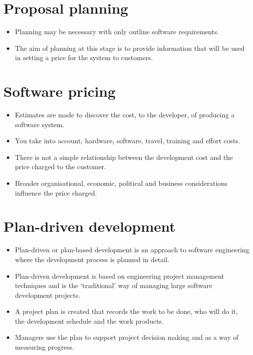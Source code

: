 \section{Proposal planning}
\begin{itemize}

\item Planning may be necessary with only outline software requirements.

\item The aim of planning at this stage is to provide information that will be used in setting a price for the system to customers.
\end{itemize}
\section{Software pricing}
\begin{itemize}

\item Estimates are made to discover the cost, to the developer, of producing a software system.

  \item You take into account, hardware, software, travel, training and effort costs.

\item There is not a simple relationship between the development cost and the price charged to the customer.

\item Broader organisational, economic, political and business considerations influence the price charged.
\end{itemize}

\section{Plan-driven development}
\begin{itemize}

\item Plan-driven or plan-based development is an approach to software engineering where the development process is planned in detail.

  \item Plan-driven development is based on engineering project management techniques and is the ‘traditional’ way of managing large software development projects.

\item A project plan is created that records the work to be done, who will do it, the development schedule and the work products.

\item Managers use the plan to support project decision making and as a way of measuring progress.
\end{itemize}

